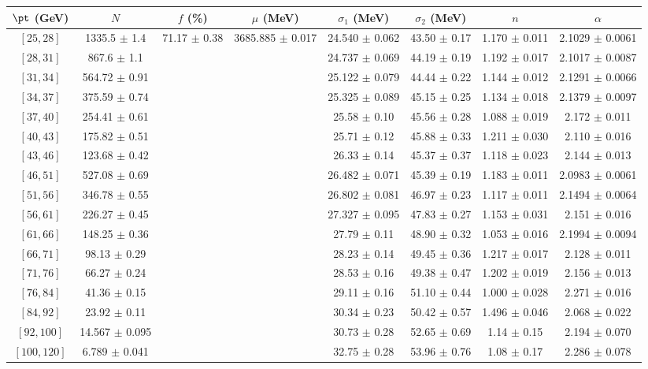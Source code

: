 \begin{tabular}{c||c|c|c|c|c|c|c}
$\pt$ (GeV) & $N$ & $f$ (\%) & $\mu$ (MeV) & $\sigma_1$ (MeV) & $\sigma_2$ (MeV) & $n$ & $\alpha$ \\
\hline
$[25, 28]$ & 1335.5 $\pm$ 1.4 & \multirow{17}{*}{71.17 $\pm$ 0.38} & \multirow{17}{*}{3685.885 $\pm$ 0.017} & 24.540 $\pm$ 0.062 & 43.50 $\pm$ 0.17 & 1.170 $\pm$ 0.011 & 2.1029 $\pm$ 0.0061\\
$[28, 31]$ & 867.6 $\pm$ 1.1 &  &  & 24.737 $\pm$ 0.069 & 44.19 $\pm$ 0.19 & 1.192 $\pm$ 0.017 & 2.1017 $\pm$ 0.0087\\
$[31, 34]$ & 564.72 $\pm$ 0.91 &  &  & 25.122 $\pm$ 0.079 & 44.44 $\pm$ 0.22 & 1.144 $\pm$ 0.012 & 2.1291 $\pm$ 0.0066\\
$[34, 37]$ & 375.59 $\pm$ 0.74 &  &  & 25.325 $\pm$ 0.089 & 45.15 $\pm$ 0.25 & 1.134 $\pm$ 0.018 & 2.1379 $\pm$ 0.0097\\
$[37, 40]$ & 254.41 $\pm$ 0.61 &  &  & 25.58 $\pm$ 0.10 & 45.56 $\pm$ 0.28 & 1.088 $\pm$ 0.019 & 2.172 $\pm$ 0.011\\
$[40, 43]$ & 175.82 $\pm$ 0.51 &  &  & 25.71 $\pm$ 0.12 & 45.88 $\pm$ 0.33 & 1.211 $\pm$ 0.030 & 2.110 $\pm$ 0.016\\
$[43, 46]$ & 123.68 $\pm$ 0.42 &  &  & 26.33 $\pm$ 0.14 & 45.37 $\pm$ 0.37 & 1.118 $\pm$ 0.023 & 2.144 $\pm$ 0.013\\
$[46, 51]$ & 527.08 $\pm$ 0.69 &  &  & 26.482 $\pm$ 0.071 & 45.39 $\pm$ 0.19 & 1.183 $\pm$ 0.011 & 2.0983 $\pm$ 0.0061\\
$[51, 56]$ & 346.78 $\pm$ 0.55 &  &  & 26.802 $\pm$ 0.081 & 46.97 $\pm$ 0.23 & 1.117 $\pm$ 0.011 & 2.1494 $\pm$ 0.0064\\
$[56, 61]$ & 226.27 $\pm$ 0.45 &  &  & 27.327 $\pm$ 0.095 & 47.83 $\pm$ 0.27 & 1.153 $\pm$ 0.031 & 2.151 $\pm$ 0.016\\
$[61, 66]$ & 148.25 $\pm$ 0.36 &  &  & 27.79 $\pm$ 0.11 & 48.90 $\pm$ 0.32 & 1.053 $\pm$ 0.016 & 2.1994 $\pm$ 0.0094\\
$[66, 71]$ & 98.13 $\pm$ 0.29 &  &  & 28.23 $\pm$ 0.14 & 49.45 $\pm$ 0.36 & 1.217 $\pm$ 0.017 & 2.128 $\pm$ 0.011\\
$[71, 76]$ & 66.27 $\pm$ 0.24 &  &  & 28.53 $\pm$ 0.16 & 49.38 $\pm$ 0.47 & 1.202 $\pm$ 0.019 & 2.156 $\pm$ 0.013\\
$[76, 84]$ & 41.36 $\pm$ 0.15 &  &  & 29.11 $\pm$ 0.16 & 51.10 $\pm$ 0.44 & 1.000 $\pm$ 0.028 & 2.271 $\pm$ 0.016\\
$[84, 92]$ & 23.92 $\pm$ 0.11 &  &  & 30.34 $\pm$ 0.23 & 50.42 $\pm$ 0.57 & 1.496 $\pm$ 0.046 & 2.068 $\pm$ 0.022\\
$[92, 100]$ & 14.567 $\pm$ 0.095 &  &  & 30.73 $\pm$ 0.28 & 52.65 $\pm$ 0.69 & 1.14 $\pm$ 0.15 & 2.194 $\pm$ 0.070\\
$[100, 120]$ & 6.789 $\pm$ 0.041 &  &  & 32.75 $\pm$ 0.28 & 53.96 $\pm$ 0.76 & 1.08 $\pm$ 0.17 & 2.286 $\pm$ 0.078\\
\end{tabular}
